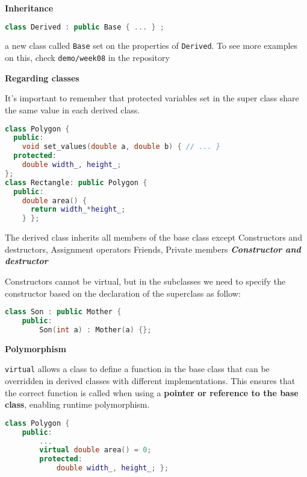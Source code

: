 \documentclass[fontsize=8pt, a4paper, landscape, fleqn]{scrartcl}
\renewcommand{\section}[1]{%
    \noindent\colorbox{sectioncolor}{%
        \parbox{\dimexpr\columnwidth-2\fboxsep}{\color{white}\textbf{#1}}}%
    \vspace{0.5mm}%
}
\renewcommand{\subsection}[1]{%
    \noindent\colorbox{subsectioncolor}{%
        \parbox{\dimexpr\columnwidth-2\fboxsep}{\color{white}\textbf{#1}}}%
    \vspace{0.5mm}%
}
\renewcommand{\subsubsection}[1]{%
    \noindent\textbf{\textit{\color{subsectioncolor}#1}}%
    \vspace{1mm}%
}
\begin{document}
\begin{multicols*}{3}[\raggedcolumns]
	\section{Inheritance} 
\begin{lstlisting}[language=C++, breaklines]
class Derived : public Base { ... } ;\end{lstlisting}
    a new class called \lstinline{Base} set on the properties of \lstinline{Derived}.
    To see more examples on this, check \lstinline{demo/week08} in the repository 
	\subsection{Regarding classes}
    It's important to remember that protected variables set in the super class share the same value in each derived class.
\begin{lstlisting}[language=C++, breaklines]
class Polygon {
  public:
    void set_values(double a, double b) { // ... }
  protected:
    double width_, height_;
};
class Rectangle: public Polygon {
  public:
    double area() {
      return width_*height_;
    } };\end{lstlisting}
    The derived class inherits all members of the base class except Constructors and destructors, Assignment operators Friends, Private members
    \subsubsection{Constructor and destructor}
    Constructors cannot be virtual, but in the subclasses we need to specify the constructor based on the declaration of the superclass as follow:
\begin{lstlisting}[language=C++, breaklines, emph={Mother}, emphstyle={\color{red}}]
class Son : public Mother {
    public:
        Son(int a) : Mother(a) {};\end{lstlisting}

	\section{Polymorphism} 
    \lstinline{virtual} 
allows a class to define a function in the base class that can be overridden in derived classes with different implementations. This ensures that the correct function is called when using a \textbf{pointer or reference to the base class}, enabling runtime polymorphism.
\begin{lstlisting}[language=C++, breaklines, emph={typedef}, emphstyle={\color{red}}]
class Polygon {
    public:
        ...
        virtual double area() = 0;
        protected:
            double width_, height_; };
    

\end{lstlisting}
\end{multicols*}
\end{document}
